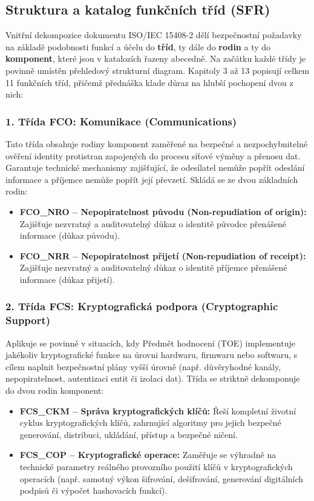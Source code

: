 \documentclass[10pt,a4paper]{article}
\begin{document}
	\subsection{Struktura a katalog funkčních tříd (SFR)}
	Vnitřní dekompozice dokumentu ISO/IEC 15408-2 dělí bezpečnostní požadavky na základě podobnosti funkcí a účelu do \textbf{tříd}, ty dále do \textbf{rodin} a ty do \textbf{komponent}, které jsou v katalozích řazeny abecedně. Na začátku každé třídy je povinně umístěn přehledový strukturní diagram. Kapitoly 3 až 13 popisují celkem 11 funkčních tříd, přičemž přednáška klade důraz na hlubší pochopení dvou z nich:
			
	\subsubsection*{1. Třída FCO: Komunikace (Communications)}
	Tato třída obsahuje rodiny komponent zaměřené na bezpečné a nezpochybnitelné ověření identity protistran zapojených do procesu síťové výměny a přenosu dat. Garantuje technické mechanismy zajišťující, že odesílatel nemůže popřít odeslání informace a příjemce nemůže popřít její převzetí. Skládá se ze dvou základních rodin:

	\begin{itemize}
		\item \textbf{FCO\_NRO -- Nepopiratelnost původu (Non-repudiation of origin):} Zajišťuje nezvratný a auditovatelný důkaz o identitě původce přenášené informace (důkaz původu).

		\item \textbf{FCO\_NRR -- Nepopiratelnost přijetí (Non-repudiation of receipt):} Zajišťuje nezvratný a auditovatelný důkaz o identitě příjemce přenášené informace (důkaz přijetí).
	\end{itemize}
			
	\subsubsection*{2. Třída FCS: Kryptografická podpora (Cryptographic Support)}
	Aplikuje se povinně v situacích, kdy Předmět hodnocení (TOE) implementuje jakékoliv kryptografické funkce na úrovni hardwaru, firmwaru nebo softwaru, s cílem naplnit bezpečnostní plány vyšší úrovně (např. důvěryhodné kanály, nepopiratelnost, autentizaci entit či izolaci dat). Třída se striktně dekomponuje do dvou rodin komponent:
	\begin{itemize}
		\item \textbf{FCS\_CKM -- Správa kryptografických klíčů:} Řeší kompletní životní cyklus kryptografických klíčů, zahrnující algoritmy pro jejich bezpečné generování, distribuci, ukládání, přístup a bezpečné ničení.
	
		\item \textbf{FCS\_COP -- Kryptografické operace:} Zaměřuje se výhradně na technické parametry reálného provozního použití klíčů v kryptografických operacích (např. samotný výkon šifrování, dešifrování, generování digitálních podpisů či výpočet hashovacích funkcí).
	\end{itemize}
			
\end{document}
